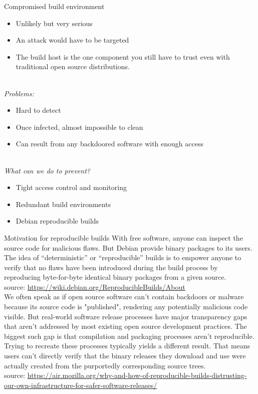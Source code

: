 \documentclass[11pt]{beamer}
\begin{document}
\begin{frame}{Compromised build environment}
\begin{itemize}
\item Unlikely but very serious\\
\item An attack would have to be targeted\\ %
\item The build host is the one component you still have to trust even with traditional open source distributions. %
\end{itemize}
\\[0.2cm]
\pause
\emph{Problems:}
\begin{itemize}
\item Hard to detect
\item Once infected, almost impossible to clean
\item Can result from any backdoored software with enough access
\end{itemize}
\\[0.2cm]
\pause
\emph{What can we do to prevent?}
\begin{itemize}
\item Tight access control and monitoring
\item Redundant build environments  %
\item Debian reproducible builds    %
\end{itemize}
\end{frame}

\begin{frame}{Motivation for reproducible builds}
With free software, anyone can inspect the source code for malicious flaws. But Debian provide binary packages to its users. The idea of “deterministic” or “reproducible” builds is to empower anyone to verify that no flaws have been introduced during the build process by reproducing byte-for-byte identical binary packages from a given source. \\
source: \href{https://wiki.debian.org/ReproducibleBuilds/About}{https://wiki.debian.org/ReproducibleBuilds/About}
\\[0.1cm]
We often speak as if open source software can't contain backdoors or malware because its source code is "published", rendering any potentially malicious code visible. But real-world software release processes have major transparency gaps that aren't addressed by most existing open source development practices. The biggest such gap is that compilation and packaging processes aren't reproducible. Trying to recreate these processes typically yields a different result. That means users can't directly verify that the binary releases they download and use were actually created from the purportedly corresponding source trees.\\
source: \href{https://air.mozilla.org/why-and-how-of-reproducible-builds-distrusting-our-own-infrastructure-for-safer-software-releases/}{https://air.mozilla.org/why-and-how-of-reproducible-builds-distrusting-our-own-infrastructure-for-safer-software-releases/}
\end{frame}
\end{document}
